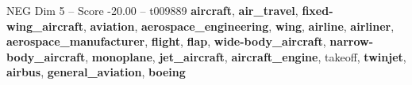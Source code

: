 \begin{textsample}{NEG Dim 5 – Score -20.00 – t009889}  \label{ex:f5_neg_013}
\textbf{aircraft}, \textbf{air\_travel}, \textbf{fixed-wing\_aircraft}, \textbf{aviation}, \textbf{aerospace\_engineering}, \textbf{wing}, \textbf{airline}, \textbf{airliner}, \textbf{aerospace\_manufacturer}, \textbf{flight}, \textbf{flap}, \textbf{wide-body\_aircraft}, \textbf{narrow-body\_aircraft}, \textbf{monoplane}, \textbf{jet\_aircraft}, \textbf{aircraft\_engine}, takeoff, \textbf{twinjet}, \textbf{airbus}, \textbf{general\_aviation}, \textbf{boeing}

\end{textsample}
